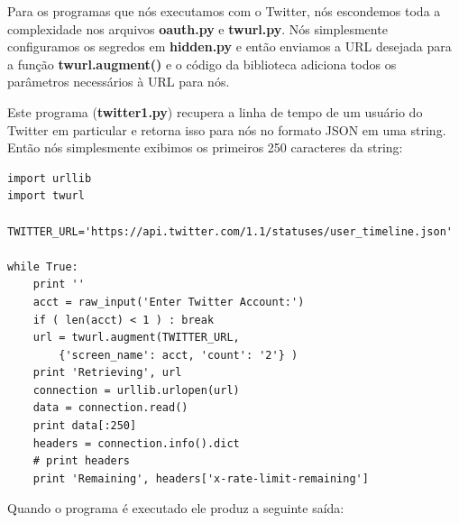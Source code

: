 Para os programas que nós executamos com o Twitter, nós escondemos toda
a complexidade nos arquivos {\bf oauth.py} e {\bf twurl.py}.
Nós simplesmente configuramos os segredos em {\bf hidden.py}
e então enviamos a URL desejada para a função 
{\bf twurl.augment()} e o código da biblioteca adiciona todos
os parâmetros necessários à URL para nós.

Este programa ({\bf twitter1.py}) recupera a linha de tempo
de um usuário do Twitter em particular e retorna isso para nós
no formato JSON em uma string. Então nós simplesmente exibimos
os primeiros 250 caracteres da string:

\beforeverb
\begin{verbatim}
import urllib
import twurl

TWITTER_URL='https://api.twitter.com/1.1/statuses/user_timeline.json'

while True:
    print ''
    acct = raw_input('Enter Twitter Account:')
    if ( len(acct) < 1 ) : break
    url = twurl.augment(TWITTER_URL,
        {'screen_name': acct, 'count': '2'} )
    print 'Retrieving', url
    connection = urllib.urlopen(url)
    data = connection.read()
    print data[:250]
    headers = connection.info().dict
    # print headers
    print 'Remaining', headers['x-rate-limit-remaining']
\end{verbatim}
\afterverb
%
Quando o programa é executado ele produz a seguinte saída:
 
